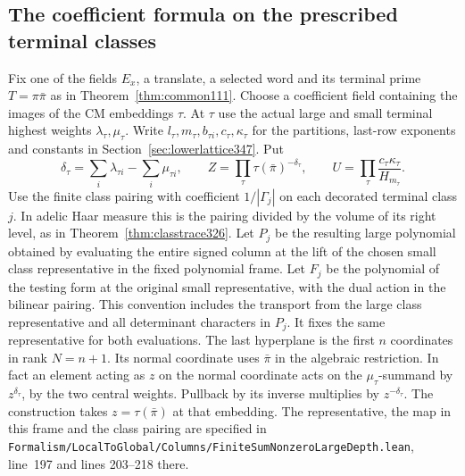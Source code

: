\documentclass[a4paper,11pt]{article}
\theoremstyle{definition}
\theoremstyle{remark}
\newcommand{\srcloc}[2]{{\small\nolinkurl{#1.lean}}, line~#2}
\numberwithin{equation}{section}
\begin{document}
\subsection{The coefficient formula on the prescribed terminal classes}\label{sec:terminalformula347}

Fix one of the fields \(E_x\), a translate, a selected word and its
terminal prime \(T=\pi\bar\pi\) as in Theorem~\ref{thm:common111}.
Choose a coefficient field containing the images of the CM
embeddings \(\tau\). At \(\tau\) use the actual large and small
terminal highest weights \(\lambda_\tau,\mu_\tau\). Write
\(l_\tau,m_\tau,b_{\tau i},c_\tau,\kappa_\tau\) for the
partitions, last-row exponents and constants in
Section~\ref{sec:lowerlattice347}. Put
\[
 \delta_\tau=\sum_i\lambda_{\tau i}-\sum_i\mu_{\tau i},\qquad
 Z=\prod_\tau \tau(\bar\pi)^{-\delta_\tau},\qquad
 U=\prod_\tau\frac{c_\tau\kappa_\tau}{H_{m_\tau}}.
\]
Use the finite class pairing with coefficient \(1/|\Gamma_j|\)
on each decorated terminal class \(j\). In adelic Haar measure
this is the pairing divided by the volume of its right level, as in
Theorem~\ref{thm:classtrace326}. Let \(P_j\) be the resulting
large polynomial obtained by evaluating the entire signed column at
the lift of the chosen small class representative in the fixed
polynomial frame. Let \(F_j\) be the polynomial of the testing
form at the original small representative, with the dual action in
the bilinear pairing. This convention includes the transport from
the large class representative and all determinant characters in
\(P_j\). It fixes the same representative for both evaluations.
The last hyperplane is the first \(n\) coordinates in rank
\(N=n+1\). Its normal coordinate uses \(\bar\pi\) in the
algebraic restriction. In fact an element acting as \(z\) on
the normal coordinate acts on the \(\mu_\tau\)-summand by
\(z^{\delta_\tau}\), by the two central weights. Pullback by
its inverse multiplies by \(z^{-\delta_\tau}\). The construction
takes \(z=\tau(\bar\pi)\) at that embedding. The representative,
the map in this frame and the class pairing are specified in
\srcloc{Formalism/LocalToGlobal/Columns/FiniteSumNonzeroLargeDepth}{197}
and lines 203--218 there.
\end{document}
